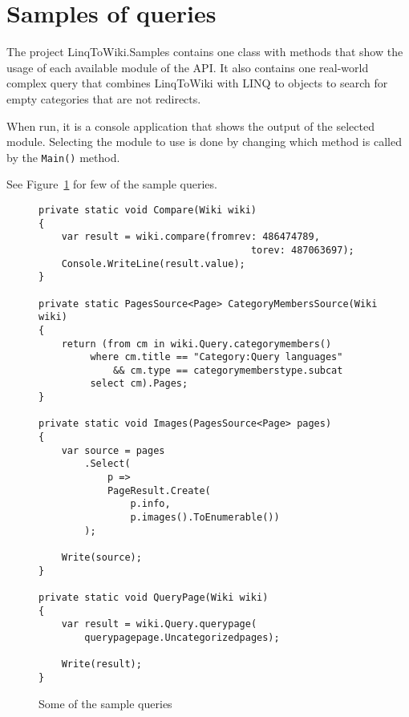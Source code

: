 \section{Samples of queries}

The project LinqToWiki.Samples contains one class with methods
that show the usage of each available module of the API.
It also contains one real-world complex query that combines LinqToWiki with LINQ to objects
to search for empty categories that are not redirects.

When run, it is a console application that shows the output of the selected module.
Selecting the module to use is done by changing which method is called by the \lstinline{Main()} method.

See Figure~\ref{query-samples} for few of the sample queries.

\begin{figure}[htbp]

\begin{lstlisting}
private static void Compare(Wiki wiki)
{
	var result = wiki.compare(fromrev: 486474789,
                                     torev: 487063697);
	Console.WriteLine(result.value);
}

private static PagesSource<Page> CategoryMembersSource(Wiki wiki)
{
	return (from cm in wiki.Query.categorymembers()
		 where cm.title == "Category:Query languages"
		     && cm.type == categorymemberstype.subcat
		 select cm).Pages;
}

private static void Images(PagesSource<Page> pages)
{
	var source = pages
		.Select(
			p =>
			PageResult.Create(
				p.info,
				p.images().ToEnumerable())
		);

	Write(source);
}

private static void QueryPage(Wiki wiki)
{
	var result = wiki.Query.querypage(
		querypagepage.Uncategorizedpages);

	Write(result);
}        
\end{lstlisting}

\caption{Some of the sample queries}
\label{query-samples}
\end{figure}